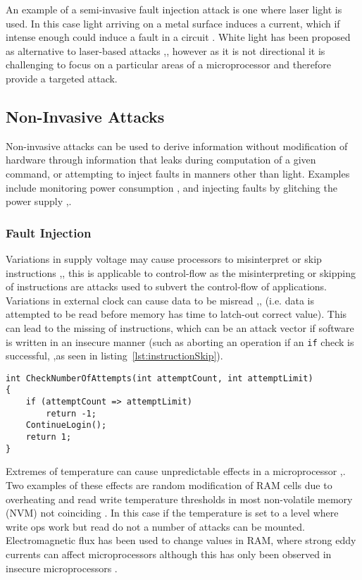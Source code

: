 An example of a semi-invasive fault injection attack is one where laser light is used. In this case light arriving on a metal surface induces a current, which if intense enough could induce a fault in a circuit \cite{Habing1965}. White light has been proposed as alternative to laser-based attacks \cite{Anderson1996},\cite{Skorobogatov2007}, however as it is not directional it is challenging to focus on a particular areas of a microprocessor and therefore provide a targeted attack.
  
\subsection{Non-Invasive Attacks}
Non-invasive attacks can be used to derive information without modification of hardware through information that leaks during computation of a given command, or attempting to inject faults in manners other than light. Examples include monitoring power consumption \cite{Maurer1999},\cite{MangardStefan2007Paa:} and injecting faults by glitching the power supply \cite{Anderson1996},\cite{Bar-el2006}. 

\subsubsection*{Fault Injection}

Variations in supply voltage may cause processors to misinterpret or skip instructions \cite{Anderson1996},\cite{Blomer2010}, this is applicable to control-flow as the misinterpreting or skipping of instructions are attacks used to subvert the control-flow of applications.
Variations in external clock can cause data to be misread \cite{Anderson1996},\cite{Street},\cite{Kommerling1999} (i.e. data is attempted to be read before memory has time to latch-out correct value). This can lead to the missing of instructions, which can be an attack vector if software is written in an insecure manner (such as aborting an operation if an \verb|if| check is successful, ,as seen in listing~\ref{lst:instructionSkip}). 

\begin{lstlisting}[language={[Sharp]C},caption={An example of code which is vulnerable to skipping of instructions},label={lst:instructionSkip}]
int CheckNumberOfAttempts(int attemptCount, int attemptLimit)
{
    if (attemptCount => attemptLimit)
        return -1;
    ContinueLogin();
    return 1;
}
\end{lstlisting}

Extremes of temperature can cause unpredictable effects in a microprocessor \cite{Boneh},\cite{Govindavajhala2003}. Two examples of these effects are random modification of RAM cells due to overheating and read write temperature thresholds in most non-volatile memory (NVM) not coinciding \cite{Bar-el2006}. In this case if the temperature is set to a level where write ops work but read do not a number of attacks can be mounted. Electromagnetic flux has been used to change values in RAM, where strong eddy currents can affect microprocessors although this has only been observed in insecure microprocessors \cite{Samyde2003}.

